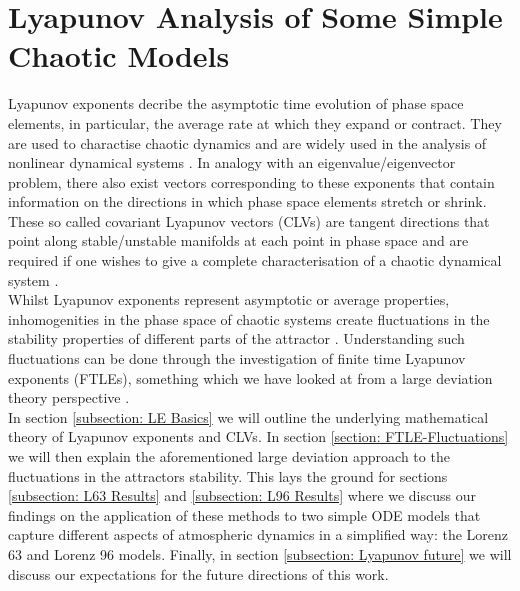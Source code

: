 \section{Lyapunov Analysis of Some Simple Chaotic Models} \label{section: Lyap-Analysis}

Lyapunov exponents decribe the asymptotic time evolution of phase space elements, in particular, the average rate at which they expand or contract. They are used to charactise chaotic dynamics and are widely used in the analysis of nonlinear dynamical systems \cite{Beck1995}. In analogy with an eigenvalue/eigenvector problem, there also exist vectors corresponding to these exponents that contain information on the directions in which phase space elements stretch or shrink. These so called covariant Lyapunov vectors (CLVs) are tangent directions that point along stable/unstable manifolds at each point in phase space and are required if one wishes to give a complete characterisation of a chaotic dynamical system \cite{Pikovsky2016a}.\\

Whilst Lyapunov exponents represent asymptotic or average properties, inhomogenities in the phase space of chaotic systems create fluctuations in the stability properties of different parts of the attractor \cite{Politi2014}. Understanding such fluctuations can be done through the investigation of finite time Lyapunov exponents (FTLEs), something which we have looked at from a large deviation theory perspective \cite{Politi2014} \cite{Touchette2009}.\\

In section \ref{subsection: LE Basics} we will outline the underlying mathematical theory of Lyapunov exponents and CLVs. In section \ref{section: FTLE-Fluctuations} we will then explain the aforementioned large deviation approach to the fluctuations in the attractors stability. This lays the ground for sections \ref{subsection: L63 Results} and \ref{subsection: L96 Results} where we discuss our findings on the application of these methods to two simple ODE models that capture different aspects of atmospheric dynamics in a simplified way: the Lorenz 63 and Lorenz 96 models. Finally, in section \ref{subsection: Lyapunov future} we will discuss our expectations for the future directions of this work.
